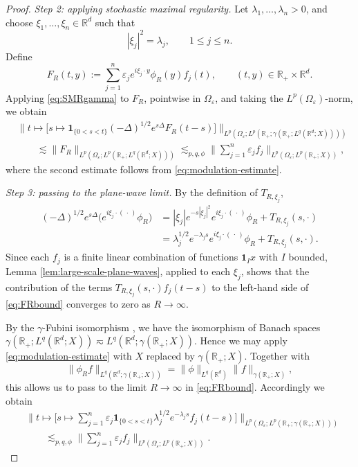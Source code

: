 \documentclass{amsart}
\let\leq\leqslant
\theoremstyle{plain}
\theoremstyle{remark}
\theoremstyle{plain}
\numberwithin{equation}{section}
\newcommand{\R}{\mathbb R}
\newcommand{\1}{\mathbf 1}
\begin{document}
\begin{proof}
\emph{Step 2: applying stochastic maximal regularity.}
Let $\lambda_1,\ldots,\lambda_n>0$, and choose
$\xi_1,\ldots,\xi_n\in\R^d$ such that
\[
        |\xi_j|^2=\lambda_j,
        \qquad 1\leq j\leq n.
\]
Define
\[
        F_R(t,y)
        :=
        \sum_{j=1}^n
        \varepsilon_je^{i\xi_j\cdot y}\phi_R(y)f_j(t),
        \qquad (t,y)\in\R_+\times\R^d.
\]
Applying \eqref{eq:SMRgamma} to $F_R$, pointwise in $\Omega_\varepsilon$, and taking the $L^p(\Omega_\varepsilon)$-norm, we obtain
\begin{equation}\label{eq:FRbound}
\begin{aligned}
&\Big\|
t\mapsto
\Big[
s\mapsto
\1_{\{0<s<t\}}
(-\Delta)^{1/2}e^{s\Delta}F_R(t-s)
\Big]
\Big\|_{L^p(\Omega_\varepsilon;
L^p(\R_+;\gamma(\R_+;L^q(\R^d;X))))}
\\
&\qquad\lesssim
\|F_R\|_{L^p(\Omega_\varepsilon;
L^p(\R_+;L^q(\R^d;X)))}
\lesssim_{p,q,\phi}
\Big\|
\sum_{j=1}^n\varepsilon_jf_j
\Big\|_{L^p(\Omega_\varepsilon;L^p(\R_+;X))},
\end{aligned}
\end{equation}
where the second estimate follows from \eqref{eq:modulation-estimate}.


\smallskip
\emph{Step 3: passing to the plane-wave limit.}
By the definition of $T_{R,\xi_j}$,
\begin{equation*}
\begin{aligned}
(-\Delta)^{1/2}e^{s\Delta}
\big(e^{i\xi_j\cdot(\,\cdot\,)}\phi_R\big)
&=
|\xi_j|e^{-s|\xi_j|^2}
e^{i\xi_j\cdot(\,\cdot\,)}\phi_R
+
T_{R,\xi_j}(s,\cdot)
\\
&=
\lambda_j^{1/2}e^{-\lambda_js}
e^{i\xi_j\cdot(\,\cdot\,)}\phi_R
+
T_{R,\xi_j}(s,\cdot).
\end{aligned}
\end{equation*}
Since each $f_j$ is a finite linear combination of functions $\1_Ix$ with $I$ bounded, Lemma \ref{lem:large-scale-plane-waves}, applied to each $\xi_j$, shows that the contribution of the terms \(T_{R,\xi_j}(s,\cdot)f_j(t-s)\) to the left-hand side of \eqref{eq:FRbound} converges to zero as $R\to\infty$.

By the $\gamma$-Fubini isomorphism \cite[Theorem 9.4.8]{HNVW2}, we have the isomorphism of Banach spaces
\(\gamma(\R_+;L^q(\R^d;X)) \eqsim L^q(\R^d;\gamma(\R_+;X))\).
 Hence we may apply \eqref{eq:modulation-estimate} with $X$ replaced by $\gamma(\R_+;X)$. Together with
\[
\|\phi_R f\|_{L^q(\R^d;\gamma(\R_+;X))}
=
\|\phi\|_{L^q(\R^d)}
\|f\|_{\gamma(\R_+;X)},
\]
this allows us to pass to the limit $R\to\infty$ in
\eqref{eq:FRbound}.
Accordingly we obtain
\begin{equation}\label{eq:lambdajfjbound}
\begin{aligned}
&\Big\|
t\mapsto
\Big[
s\mapsto
\sum_{j=1}^n
\varepsilon_j\1_{\{0<s<t\}}
\lambda_j^{1/2}e^{-\lambda_js}f_j(t-s)
\Big]
\Big\|_{L^p(\Omega_\varepsilon;
L^p(\R_+;\gamma(\R_+;X)))}
\\
&\qquad\lesssim_{p,q,\phi}
\Big\|
\sum_{j=1}^n\varepsilon_jf_j
\Big\|_{L^p(\Omega_\varepsilon;L^p(\R_+;X))}.
\end{aligned}
\end{equation}


\end{proof}
\end{document}
